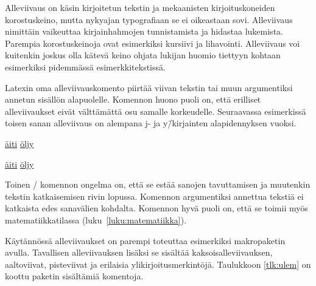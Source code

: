 Alleviivaus on käsin kirjoitetun tekstin ja mekaanisten
kirjoituskoneiden korostuskeino, mutta nykyajan typografiaan se ei
oikeastaan sovi. Alleviivaus nimittäin vaikeuttaa kirjainhahmojen
tunnistamista ja hidastaa lukemista. Parempia korostuskeinoja ovat
esimerkiksi kursiivi ja lihavointi. Alleviivaus voi kuitenkin joskus
olla kätevä keino ohjata lukijan huomio tiettyyn kohtaan esimerkiksi
pidemmässä esimerkkitekstissä.

Latexin oma alleviivauskomento  piirtää viivan
tekstin tai muun argumentiksi annetun sisällön alapuolelle. Komennon
huono puoli on, että erilliset alleviivaukset eivät välttämättä osu
samalle korkeudelle. Seuraavassa esimerkissä toisen sanan alleviivaus on
alempana j- ja y\=/kirjainten alapidennyksen vuoksi.

\begin{koodilohkosis}
\underline{äiti} \underline{öljy}
\end{koodilohkosis}

\begin{tulossis}
  \underline{äiti} \underline{öljy}
\end{tulossis}

Toinen \-/ komennon ongelma on, että se estää sanojen
tavuttamisen ja muutenkin tekstin katkaisemisen rivin lopussa. Komennon
argumentiksi annettua tekstiä ei katkaista edes sanavälien kohdalta.
Komennon hyvä puoli on, että se toimii myös matematiikkatilassa
(luku~\ref{luku:matematiikka}).

Käytännössä alleviivaukset on parempi toteuttaa esimerkiksi makropaketin
 avulla. Tavallisen alleviivauksen lisäksi
se sisältää kaksoisalleviivauksen, aaltoviivat, pisteviivat ja erilaisia
ylikirjoitusmerkintöjä. Taulukkoon \ref{tlk:ulem} on koottu paketin
sisältämiä komentoja.


